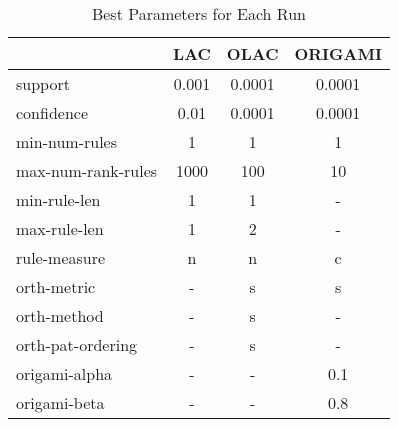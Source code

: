 \begin{table}[htbp]
	\centering
		\begin{tabular}{|l|c|c|c|}
		\hline
					& \textbf{LAC}	& \textbf{OLAC}	& \textbf{ORIGAMI}	\\
		\hline
		support			& 0.001	& 0.0001	& 0.0001		\\
		\hline
		confidence		& 0.01		& 0.0001	& 0.0001		\\
		\hline
		min-num-rules		& 1		& 1		& 1			\\
		\hline
		max-num-rank-rules	& 1000		& 100		& 10			\\
		\hline
		min-rule-len		& 1		& 1		& -			\\
		\hline
		max-rule-len		& 1		& 2		& -			\\
		\hline
		rule-measure		& n		& n		& c			\\
		\hline
		orth-metric		& -		& s		& s			\\
		\hline
		orth-method		& -		& s		& -			\\
		\hline
		orth-pat-ordering	& -		& s		& -			\\
		\hline
		origami-alpha		& -		& -		& 0.1			\\
		\hline
		origami-beta		& -		& -		& 0.8			\\
		\hline
		\end{tabular}
	\caption{Best Parameters for Each Run}
	\label{tab:best_parms_for_avg_db}
\end{table}